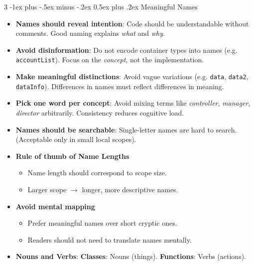 \documentclass[a4paper, 9pt, landscape]{extarticle}
\makeatletter
\renewcommand{\subsection}{\@startsection{subsubsection}{3}{0mm}%
                                {-1ex plus -.5ex minus -.2ex}%
                                {0.5ex plus .2ex}%
                                {\normalfont\small\bfseries}}
\makeatother
\begin{document}
\begin{multicols*}{3}
\subsection{Meaningful Names}
\begin{itemize}
\item \textbf{Names should reveal intention}: Code should be understandable without comments. Good naming explains \textit{what} and \textit{why}.
\item \textbf{Avoid disinformation}: Do not encode container types into names (e.g. \texttt{accountList}). Focus on the \textit{concept}, not the implementation.
\item \textbf{Make meaningful distinctions}: Avoid vague variations (e.g. \texttt{data}, \texttt{data2}, \texttt{dataInfo}). Differences in names must reflect differences in meaning.
\item \textbf{Pick one word per concept}: Avoid mixing terms like \textit{controller}, \textit{manager}, \textit{director} arbitrarily. Consistency reduces cognitive load.
\item \textbf{Names should be searchable}: Single-letter names are hard to search.
(Acceptable only in small local scopes).
\item \textbf{Rule of thumb of Name Lengths}
\begin{itemize}
\item Name length should correspond to scope size.
\item Larger scope $\rightarrow$ longer, more descriptive names.
\end{itemize}

\item \textbf{Avoid mental mapping}
\begin{itemize}
\item Prefer meaningful names over short cryptic ones.
\item Readers should not need to translate names mentally.
\end{itemize}

\item \textbf{Nouns and Verbs}: \textbf{Classes}: Nouns (things). \textbf{Functions}: Verbs (actions).
\end{itemize}


\end{multicols*}
\end{document}
